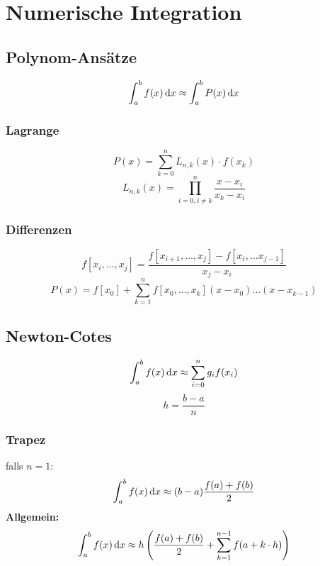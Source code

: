 \documentclass[german]{latex4ei/latex4ei_sheet}
\begin{document}
\section{Numerische Integration}
\begin{sectionbox}
\subsection{Polynom-Ansätze}
\begin{equation*}
	\int_a^b f(x) \diff x \approx \int_a^b P(x) \diff x
\end{equation*}

\subsubsection{Lagrange}
\begin{equation*}
	P(x) = \sum_{k = 0}^n L_{n, k}(x)\cdot f(x_k)
\end{equation*}
\begin{equation*}
	L_{n, k}(x) = \prod_{i = 0, i \ne k}^n \frac{x - x_i}{x_k - x_i}
\end{equation*}

\subsubsection{Differenzen}
\begin{equation*}
	f[x_i, \dots, x_j] = \frac{f[x_{i + 1}, \dots, x_j] - f[x_i, \dots x_{j - 1}]}{x_j - x_i}
\end{equation*}
\begin{equation*}
	P(x) = f[x_0] + \sum_{k = 1}^n f[x_0, \dots, x_k] (x - x_0) \dots (x - x_{k - 1})
\end{equation*}
\end{sectionbox}

\begin{sectionbox}
\subsection{Newton-Cotes}
\begin{equation*}
	\int_a^b f(x) \diff x \approx \sum_{i = 0}^n g_i f(x_i)
\end{equation*}
\begin{equation*}
	h = \frac{b - a}{n}
\end{equation*}

\subsubsection{Trapez}
falls $n = 1$:
\begin{equation*}
	\int_a^b f(x) \diff x \approx (b - a) \frac{f(a) + f(b)}{2}
\end{equation*}
\textbf{Allgemein:}
\begin{equation*}
	\int_a^b f(x) \diff x \approx h \left( \frac{f(a) + f(b)}{2} + \sum_{k = 1}^{n - 1} f(a + k \cdot h) \right)
\end{equation*}
\end{sectionbox}
\end{document}
